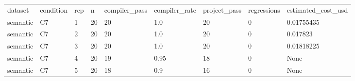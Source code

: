 \begin{tabular}{lllllllll}
dataset & condition & rep & n & compiler\_pass & compiler\_rate & project\_pass & regressions & estimated\_cost\_usd \\
semantic & C7 & 1 & 20 & 20 & 1.0 & 20 & 0 & 0.01755435 \\
semantic & C7 & 2 & 20 & 20 & 1.0 & 20 & 0 & 0.017823 \\
semantic & C7 & 3 & 20 & 20 & 1.0 & 20 & 0 & 0.01818225 \\
semantic & C7 & 4 & 20 & 19 & 0.95 & 18 & 0 & None \\
semantic & C7 & 5 & 20 & 18 & 0.9 & 16 & 0 & None \\
\end{tabular}